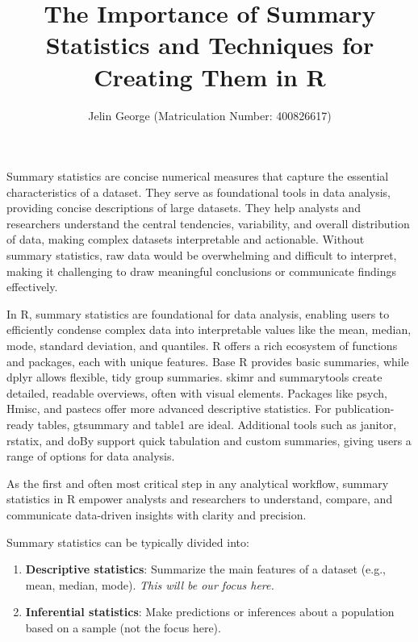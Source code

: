 \documentclass[
  man,
  floatsintext,
  longtable,
  nolmodern,
  notxfonts,
  notimes,
  colorlinks=true,linkcolor=blue,citecolor=blue,urlcolor=blue]{apa7}
\title{The Importance of Summary Statistics and Techniques for Creating
Them in R}
\author{Jelin George (Matriculation Number: 400826617)}
\affiliation{
{Hochschule Fresenius - University of Applied Science}}
\begin{document}
\maketitle


\setcounter{secnumdepth}{-\maxdimen} %

\setlength\LTleft{0pt}


Summary statistics are concise numerical measures that capture the
essential characteristics of a dataset. They serve as foundational tools
in data analysis, providing concise descriptions of large datasets. They
help analysts and researchers understand the central tendencies,
variability, and overall distribution of data, making complex datasets
interpretable and actionable. Without summary statistics, raw data would
be overwhelming and difficult to interpret, making it challenging to
draw meaningful conclusions or communicate findings effectively.

In R, summary statistics are foundational for data analysis, enabling
users to efficiently condense complex data into interpretable values
like the mean, median, mode, standard deviation, and quantiles. R offers
a rich ecosystem of functions and packages, each with unique features.
Base R provides basic summaries, while dplyr allows flexible, tidy group
summaries. skimr and summarytools create detailed, readable overviews,
often with visual elements. Packages like psych, Hmisc, and pastecs
offer more advanced descriptive statistics. For publication-ready
tables, gtsummary and table1 are ideal. Additional tools such as
janitor, rstatix, and doBy support quick tabulation and custom
summaries, giving users a range of options for data analysis.

As the first and often most critical step in any analytical workflow,
summary statistics in R empower analysts and researchers to understand,
compare, and communicate data-driven insights with clarity and
precision.

Summary statistics can be typically divided into:

\begin{enumerate}
\def\labelenumi{\arabic{enumi}.}
\item
  \textbf{Descriptive statistics}: Summarize the main features of a
  dataset (e.g., mean, median, mode). \emph{This will be our focus
  here.}
\item
  \textbf{Inferential statistics}: Make predictions or inferences about
  a population based on a sample (not the focus here).
\end{enumerate}
\end{document}
